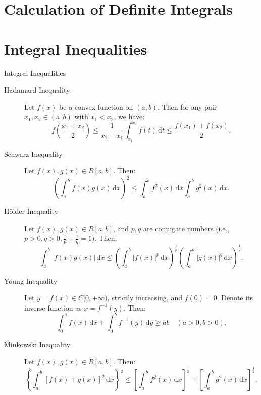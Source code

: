 \documentclass[11pt]{../../TexTemplate/elegantbook}
\begin{document}
\section{Calculation of Definite Integrals}

\section{Integral Inequalities}

\begin{theorem}{Integral Inequalities}
    \begin{description}
        \item[Hadamard Inequality] Let \( f(x) \) be a convex function on \( (a, b) \). 
            Then for any pair \( x_1, x_2 \in (a, b) \) with \( x_1 < x_2 \), we have:
            \[
            f\left( \frac{x_1 + x_2}{2} \right) \leqslant \frac{1}{x_2 - x_1} \int_{x_1}^{x_2} f(t) \, \mathrm{d}t \leqslant \frac{f(x_1) + f(x_2)}{2}.
            \]

        \item[Schwarz Inequality] Let \( f(x), g(x) \in R[a, b] \). Then:
            \[
            \left( \int_{a}^{b} f(x)g(x) \, \mathrm{d}x \right)^2 \leqslant \int_{a}^{b} f^2(x) \, \mathrm{d}x \int_{a}^{b} g^2(x) \, \mathrm{d}x.
            \]

        \item[Hölder Inequality] Let \( f(x), g(x) \in R[a, b] \), and \( p, q \) are conjugate numbers 
            (i.e., \( p > 0, q > 0, \frac{1}{p} + \frac{1}{q} = 1 \)). Then:
            \[
            \int_{a}^{b} |f(x)g(x)| \, \mathrm{d}x \leqslant \left( \int_{a}^{b} |f(x)|^p \, \mathrm{d}x \right)^{\frac{1}{p}} \left( \int_{a}^{b} |g(x)|^q \, \mathrm{d}x \right)^{\frac{1}{q}}.
            \]

        \item[Young Inequality] Let \( y = f(x) \in C[0, +\infty) \), strictly increasing, 
            and \( f(0) = 0 \). Denote its inverse function as \( x = f^{-1}(y) \). Then:
            \[
            \int_{0}^{a} f(x) \, \mathrm{d}x + \int_{0}^{b} f^{-1}(y) \, \mathrm{d}y \geqslant ab \quad (a > 0, b > 0).
            \]

        \item[Minkowski Inequality] Let \( f(x), g(x) \in R[a, b] \). Then:
            \[
            \left\{ \int_{a}^{b} [f(x) + g(x)]^2 \, \mathrm{d}x \right\}^{\frac{1}{2}} \leqslant \left[ \int_{a}^{b} f^2(x) \, \mathrm{d}x \right]^{\frac{1}{2}} + \left[ \int_{a}^{b} g^2(x) \, \mathrm{d}x \right]^{\frac{1}{2}}.
            \]


\end{description}
\end{theorem}
\end{document}
